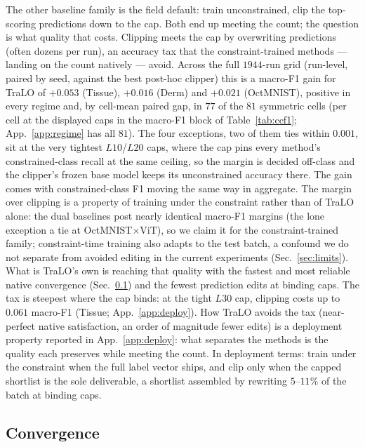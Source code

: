 \documentclass[10pt]{article}
\begin{document}
The other baseline family is the field default: train unconstrained, clip
the top-scoring predictions down to the cap. Both end up meeting the
count; the question is what quality that costs. Clipping meets the cap by
overwriting predictions (often dozens per run), an accuracy tax that the
constraint-trained methods --- landing on the count natively --- avoid.
Across the full $1944$-run grid (run-level, paired by seed, against the
best post-hoc clipper) this is a macro-F1 gain for TraLO of $+0.053$
(Tissue), $+0.016$ (Derm) and $+0.021$ (OctMNIST), positive in every
regime and, by cell-mean paired gap, in $77$ of the $81$ symmetric cells
(per cell at the displayed caps in the macro-F1 block of
Table~\ref{tab:ccf1}; App.~\ref{app:regime} has all $81$). The four
exceptions, two of them ties within $0.001$, sit at the very tightest
$L10$/$L20$ caps, where the cap pins every method's constrained-class
recall at the same ceiling, so the margin is decided off-class and the
clipper's frozen base model keeps its unconstrained accuracy there. The
gain comes with constrained-class F1 moving the same way in aggregate.
The margin over clipping is a property of training under the constraint
rather than of TraLO alone: the dual baselines post nearly identical
macro-F1 margins (the lone exception a tie at OctMNIST$\times$ViT), so we
claim it for the constraint-trained family; constraint-time training also
adapts to the test batch, a confound we do not separate from avoided
editing in the current experiments (Sec.~\ref{sec:limits}). What is
TraLO's own is reaching that quality with the fastest and most reliable
native convergence (Sec.~\ref{sec:conv}) and the fewest prediction edits
at binding caps. The tax is steepest where the cap binds: at the tight
$L30$ cap, clipping costs up to $0.061$ macro-F1 (Tissue;
App.~\ref{app:deploy}). How TraLO avoids the tax (near-perfect native
satisfaction, an order of magnitude fewer edits) is a deployment property
reported in App.~\ref{app:deploy}: what separates the methods is the
quality each preserves while meeting the count. In deployment terms:
train under the constraint when the full label vector ships, and clip only
when the capped shortlist is the sole deliverable, a shortlist assembled
by rewriting $5$--$11\%$ of the batch at binding caps.

\subsection{Convergence}
\label{sec:conv}
\end{document}
